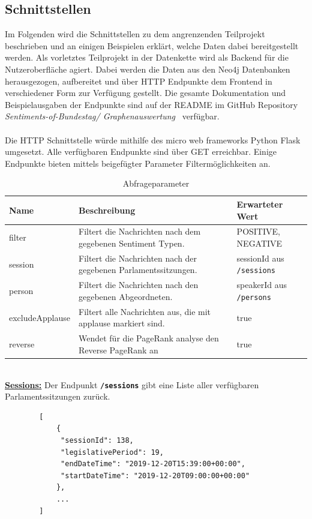 \subsection{Schnittstellen}
Im Folgenden wird die Schnittstellen zu dem angrenzenden Teilprojekt beschrieben und an einigen Beispielen erklärt, welche Daten dabei bereitgestellt werden. Als vorletztes Teilprojekt in der Datenkette wird als Backend für die Nutzeroberfläche agiert. Dabei werden die Daten aus den Neo4j Datenbanken herausgezogen, aufbereitet und über HTTP Endpunkte dem Frontend in verschiedener Form zur Verfügung gestellt. Die gesamte Dokumentation und Beispielausgaben der Endpunkte sind auf der README im GitHub Repository \textit{Sentiments-of-Bundestag/ Graphenauswertung}~\cite{github_endpoints} verfügbar.
\\~\\
Die HTTP Schnittstelle würde mithilfe des micro web frameworks Python Flask \cite{flask} umgesetzt. Alle verfügbaren Endpunkte sind über GET erreichbar. Einige Endpunkte bieten mittels beigefügter Parameter Filtermöglichkeiten an. 
\begin{table}[ht]
	\caption{Abfrageparameter}
	\label{tab:filter}
	\begin{tabular}{|p{3 cm}|p{8.5 cm}|p{2.5 cm}|}
		\hline
		\textbf{Name} & \textbf{Beschreibung} & \textbf{Erwarteter Wert} \\
		\hline
		filter & Filtert die Nachrichten nach dem gegebenen Sentiment Typen. & POSITIVE, NEGATIVE \\
		\hline
		session & Filtert die Nachrichten nach der gegebenen Parlamentssitzungen. & sessionId aus \texttt{/sessions} \\
		\hline
		person & Filtert die Nachrichten nach den gegebenen Abgeordneten. & speakerId aus \texttt{/persons} \\
		\hline
		excludeApplause & Filtert alle Nachrichten aus, die mit applause markiert sind. & true \\
		\hline
		reverse & Wendet für die PageRank analyse den Reverse PageRank an & true \\
		\hline
	\end{tabular}
\end{table} 
~\\
\textbf{\underline{Sessions:}}\newline
Der Endpunkt \textbf{\texttt{/sessions}} gibt eine Liste aller verfügbaren Parlamentssitzungen zurück.
\begin{lstlisting}
		[
			{
			 "sessionId": 138, 
			 "legislativePeriod": 19, 
			 "endDateTime": "2019-12-20T15:39:00+00:00", 
			 "startDateTime": "2019-12-20T09:00:00+00:00"
			},
			...
		]
\end{lstlisting}	
